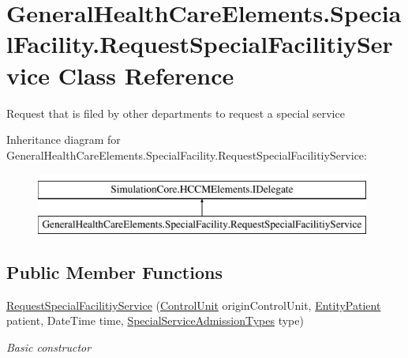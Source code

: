 \hypertarget{class_general_health_care_elements_1_1_special_facility_1_1_request_special_facilitiy_service}{}\section{General\+Health\+Care\+Elements.\+Special\+Facility.\+Request\+Special\+Facilitiy\+Service Class Reference}
\label{class_general_health_care_elements_1_1_special_facility_1_1_request_special_facilitiy_service}


Request that is filed by other departments to request a special service  


Inheritance diagram for General\+Health\+Care\+Elements.\+Special\+Facility.\+Request\+Special\+Facilitiy\+Service\+:\begin{figure}[H]
\begin{center}
\leavevmode
\includegraphics[height=2.000000cm]{class_general_health_care_elements_1_1_special_facility_1_1_request_special_facilitiy_service}
\end{center}
\end{figure}
\subsection*{Public Member Functions}
\begin{DoxyCompactItemize}
\item 
\hyperlink{class_general_health_care_elements_1_1_special_facility_1_1_request_special_facilitiy_service_a144fad3c526cab14c8548ae25d54c929}{Request\+Special\+Facilitiy\+Service} (\hyperlink{class_simulation_core_1_1_h_c_c_m_elements_1_1_control_unit}{Control\+Unit} origin\+Control\+Unit, \hyperlink{class_general_health_care_elements_1_1_entities_1_1_entity_patient}{Entity\+Patient} patient, Date\+Time time, \hyperlink{class_general_health_care_elements_1_1_treatment_admission_types_1_1_special_service_admission_types}{Special\+Service\+Admission\+Types} type)
\begin{DoxyCompactList}\small\item\em Basic constructor \end{DoxyCompactList}\end{DoxyCompactItemize}
